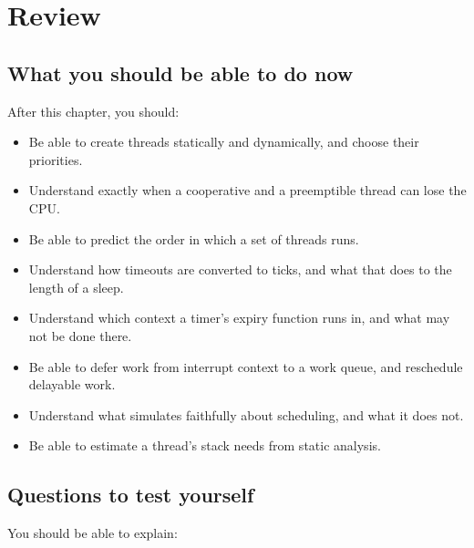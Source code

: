 
\section{Review}
\label{c3:sec:review}

\subsection*{What you should be able to do now}
After this chapter, you should:

\begin{itemize}
  \item Be able to create threads statically and dynamically, and choose their priorities.
  \item Understand exactly when a cooperative and a preemptible thread can lose the CPU.
  \item Be able to predict the order in which a set of threads runs.
  \item Understand how timeouts are converted to ticks, and what that does to the length of a sleep.
  \item Understand which context a timer’s expiry function runs in, and what may not be done there.
  \item Be able to defer work from interrupt context to a work queue, and reschedule delayable work.
  \item Understand what  simulates faithfully about scheduling, and what it does not.
  \item Be able to estimate a thread’s stack needs from static analysis.
\end{itemize}

\subsection*{Questions to test yourself}
You should be able to explain:

